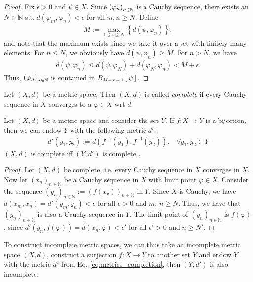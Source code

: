 \begin{proof}
	Fix $\epsilon > 0$ and $\psi\in X$. Since $\seq[\varphi_n]$ is a Cauchy sequence, there exists an $N\in\mathbb N$ s.t. $d(\varphi_m, \varphi_n) <\epsilon$ for all $m, n\geq N$. Define
	\begin{align}
		M := \max_{1\leq i\leq N}\left\{ d(\psi, \varphi_n) \right\}, 
	\end{align}
	and note that the maximum exists since we take it over a set with finitely many elements. For $n\leq N$, we obviously have $d(\psi, \varphi_n)\geq M$. For $n > N$, we have
	\begin{align*}
		d(\psi, \varphi_n) \leq d(\psi, \varphi_N) + d(\varphi_N, \varphi_n) < M + \epsilon.
	\end{align*}
	Thus, $\seq[\varphi_n]$ is contained in $B_{M + \epsilon + 1}[\psi]$.
\end{proof}

\begin{defn}
	Let $(X, d)$ be a metric space. Then $(X, d)$ is called \textit{complete} if every Cauchy sequence in $X$ converges to a $\varphi\in X$ wrt $d$.
\end{defn}

\begin{theorem}
	Let $(X, d)$ be a metric space and consider the set $Y$. If $f: X\to Y$ is a bijection, then we can endow $Y$ with the following metric $d'$:
	\begin{align}\label{eq:metrics_completion}
		d'(y_1, y_2) := d\left(f^{-1}(y_1), f^{-1}(y_2)\right). \quad \forall y_1, y_2\in Y
	\end{align}
	$(X, d)$ is complete iff $(Y, d')$ is complete \cite{3789234}.
\end{theorem}

\begin{proof}
	Let $(X, d)$ be complete, i.e. every Cauchy sequence in $X$ converges in $X$. Now let $(x_n)_{n\in\mathbb N}$ be a Cauchy sequence in $X$ with limit point $\varphi\in X$. Consider the sequence $(y_n)_{n\in\mathbb N} := \left(f(x_n)\right)_{n\in\mathbb N}$ in $Y$. Since $X$ is Cauchy, we have $ d(x_m, x_n) = d'(y_m, y_n) < \epsilon$ for all $\epsilon > 0$ and $m$, $n\geq N$. Thus, we have that $(y_{n})_{n\in\mathbb N}$ is also a Cauchy sequence in $Y$. The limit point of $\left(y_n\right)_{n\in\mathbb N}$ is $f(\varphi)$, since $d'(y_n, f(\varphi)) = d(x_n, \varphi) < \epsilon'$ for all $\epsilon' > 0$ and $n\geq N'$.
\end{proof}

\begin{remark}
	To construct incomplete metric spaces, we can thus take an incomplete metric space $(X, d)$, construct a surjection $f:X\to Y$ to another set $Y$ and endow $Y$ with the metric $d'$ from Eq. \eqref{eq:metrics_completion}, then $(Y, d')$ is also incomplete.
\end{remark}

